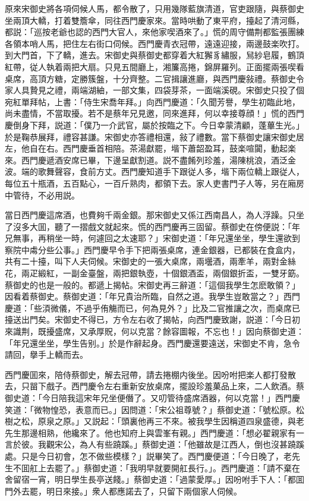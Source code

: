 原來宋御史將各項伺候人馬，都令散了，只用幾隊藍旗清道，官吏跟隨，與蔡御史坐兩頂大轎，打着雙簷傘，同往西門慶家來。當時哄動了東平府，擡起了清河縣，都説：「巡按老爺也認的西門大官人，來他家喫酒來了。」慌的周守備荆都監張團練各領本哨人馬，把住左右街口伺候。西門慶青衣冠帶，遠遠迎接，兩邊鼓楽吹打。到大門首，下了轎，進去。宋御史與蔡御史都穿着大紅獬豸繡服，舃紗皂履，鶴頂紅帶，従人執着兩把大扇。只見五間廳上，湘簾高捲，錦屏羅列。正面擺兩張喫看桌席，高頂方糖，定勝簇盤，十分齊整。二官揖讓進廳，與西門慶敍禮。蔡御史令家人具贄見之禮，兩端湖紬，一部文集，四袋芽茶，一面端溪硯。宋御史只投了個宛紅單拜帖，上書：「侍生宋喬年拜。」向西門慶道：「久聞芳譽，學生初臨此地，尚未盡情，不當取擾。若不是蔡年兄見邀，同來進拜，何以幸接尊顔！」慌的西門慶倒身下拜，説道：「僕乃一介武官，屬於按臨之下。今日幸蒙清顧，蓬蓽生光。」於是鞠恭展拜，禮容甚謙。宋御史亦答禮相還，敍了禮數。當下蔡御史讓宋御史居左，他自在右。西門慶垂首相陪。茶湯獻罷，堦下蕭韶盈耳，鼓楽喧闐，動起楽來。西門慶遞酒安席已畢，下邊呈獻割道。説不盡餚列珍羞，湯陳桃浪，酒泛金波。端的歌舞聲容，食前方丈。西門慶知道手下跟従人多，堦下兩位轎上跟従人，每位五十瓶酒，五百點心，一百斤熟肉，都領下去。家人吏書門子人等，另在廂房中管待，不必用説。

當日西門慶這席酒，也費夠千兩金銀。那宋御史又係江西南昌人，為人浮躁。只坐了沒多大囬，聽了一摺戲文就起來。慌的西門慶再三固留。蔡御史在傍便説：「年兄無事，再稍坐一時，何遽回之太速耶？」宋御史道：「年兄還坐坐，學生還欲到察院中䖏分些公事。」西門慶早令手下把兩張桌席，連金銀器，已都裝在食盒内，共有二十擡，叫下人夫伺候。宋御史的一張大桌席，兩壜酒，兩牽羊，兩對金絲花，兩疋緞紅，一副金臺盤，兩把銀執壺，十個銀酒盃，兩個銀折盃，一雙牙筯。蔡御史的也是一般的。都遞上揭帖。宋御史再三辭道：「這個我學生怎麽敢領？」因看着蔡御史。蔡御史道：「年兄貴治所臨，自然之道。我學生豈敢當之？」西門慶道：「些湏微儀，不過乎侑觴而已，何為見外？」比及二官推讓之次，而桌席已擡送出門矣。宋御史不得已，方令左右收了揭帖，向西門慶致謝，説道：「今日初來識荆，既擾盛席，又承厚貺，何以克當？餘容圖報，不忘也！」因向蔡御史道：「年兄還坐坐，學生告别。」於是作辭起身。西門慶還要遠送，宋御史不肯，急令請回，擧手上轎而去。

西門慶囬來，陪侍蔡御史，解去冠帶，請去捲棚内後坐。因吩咐把楽人都打發散去，只㽞下戲子。西門慶令左右重新安放桌席，擺設珍羞菓品上來，二人飲酒。蔡御史道：「今日陪我這宋年兄坐便僭了。又叨管待盛席酒器，何以克當！」西門慶笑道：「微物惶恐，表意而已。」因問道：「宋公祖尊號？」蔡御史道：「號松原。松樹之松，原泉之原。」又説起：「頭裏他再三不來。被我學生因稱道四泉盛德，與老先生那邊相熟，他纔來了。他也知府上與雲峯有親。」西門慶道：「想必翟親家有一言於彼。我觀宋公，為人有些蹺蹊。」蔡御史道：「他雖故是江西人，倒也沒甚蹺蹊處。只是今日初會，怎不做些模樣？」説畢笑了。西門慶便道：「今日晚了，老先生不囬舡上去罷了。」蔡御史道：「我明早就要開舡長行。」。西門慶道：「請不棄在舍留宿一宵，明日學生長亭送餞。」蔡御史道：「過蒙愛厚。」因吩咐手下人：「都囬門外去罷，明日來接。」衆人都應諾去了，只留下兩個家人伺候。

